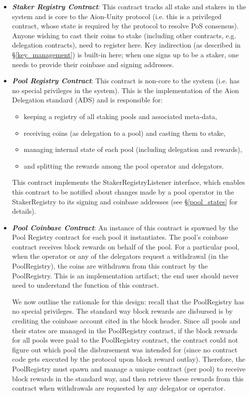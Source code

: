 \begin{itemize}
    \item \textbf{\textit{Staker Registry Contract}}: This contract tracks all stake and stakers in the system and is core to the Aion-Unity protocol (i.e. this is a privileged contract, whose state is required by the protocol to resolve PoS consensus). Anyone wishing to cast their coins to stake (including other contracts, e.g. delegation contracts), need to register here. Key indirection (as described in \S\ref{key_management}) is built-in here; when one signs up to be a staker, one needs to provide their coinbase and signing addresses. 
    \item \textbf{\textit{Pool Registry Contract}}: This contract is non-core to the system (i.e. has no special privileges in the system). This is the implementation of the Aion Delegation standard (ADS) and is responsible for: 
    \begin{itemize}[label=--,nosep]
        \item keeping a registry of all staking pools and associated meta-data,
        \item receiving coins (as delegation to a pool) and casting them to stake, 
        \item managing internal state of each pool (including delegation and rewards),
        \item and splitting the rewards among the pool operator and delegators. 
    \end{itemize}
    This contract implements the StakerRegistryListener interface, which enables this contract to be notified about changes made by a pool operator in the StakerRegistry to its signing and coinbase addresses (see \S\ref{pool_states} for details). 
    \item \textbf{\textit{Pool Coinbase Contract}}: An instance of this contract is spawned by the Pool Registry contract for each pool it instantiates. The pool's coinbase contract receives block rewards on behalf of the pool. For a particular pool, when the operator or any of the delegators request a withdrawal (in the PoolRegistry), the coins are withdrawn from this contract by the PoolRegistry. This is an implementation artifact; the end user should never need to understand the function of this contract. 
    
    We now outline the rationale for this design: recall that the PoolRegistry has no special privileges. The standard way block rewards are disbursed is by crediting the coinbase account cited in the block header. Since all pools and their states are managed in the PoolRegistry contract, if the block rewards for all pools were paid to the PoolRegistry contract, the contract could not figure out which pool the disbursement was intended for (since no contract code gets executed by the protocol upon block reward outlay). Therefore, the PoolRegistry must spawn and manage a unique contract (per pool) to receive block rewards in the standard way, and then retrieve these rewards from this contract when withdrawals are requested by any delegator or operator.  
\end{itemize}


